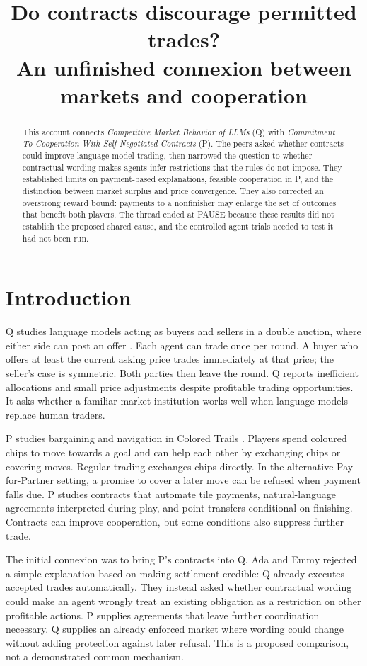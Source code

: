 \documentclass{article}
\title{Do contracts discourage permitted trades?\\An unfinished connexion between markets and cooperation}
\author{}
\date{}
\begin{document}
\maketitle
\begin{abstract}
This account connects \emph{Competitive Market Behavior of LLMs} (Q) with \emph{Commitment To Cooperation With
Self-Negotiated Contracts} (P). The peers asked whether contracts could improve language-model trading, then
narrowed the question to whether contractual wording makes agents infer restrictions that the rules do not
impose. They established limits on payment-based explanations, feasible cooperation in P, and the distinction
between market surplus and price convergence. They also corrected an overstrong reward bound: payments to a
nonfinisher may enlarge the set of outcomes that benefit both players. The thread ended at PAUSE because these
results did not establish the proposed shared cause, and the controlled agent trials needed to test it had not
been run.
\end{abstract}

\section{Introduction}
Q studies language models acting as buyers and sellers in a double auction, where either side can post an
offer \cite{Q}. Each agent can trade once per round. A buyer who offers at least the current asking price
trades immediately at that price; the seller's case is symmetric. Both parties then leave the round. Q reports
inefficient allocations and small price adjustments despite profitable trading opportunities. It asks whether
a familiar market institution works well when language models replace human traders.

P studies bargaining and navigation in Colored Trails \cite{P}. Players spend coloured chips to move towards a
goal and can help each other by exchanging chips or covering moves. Regular trading exchanges chips directly.
In the alternative Pay-for-Partner setting, a promise to cover a later move can be refused when payment falls
due. P studies contracts that automate tile payments, natural-language agreements interpreted during play, and
point transfers conditional on finishing. Contracts can improve cooperation, but some conditions also suppress
further trade.

The initial connexion was to bring P's contracts into Q. Ada and Emmy rejected a simple explanation based on
making settlement credible: Q already executes accepted trades automatically. They instead asked whether
contractual wording could make an agent wrongly treat an existing obligation as a restriction on other
profitable actions. P supplies agreements that leave further coordination necessary. Q supplies an already
enforced market where wording could change without adding protection against later refusal. This is a proposed
comparison, not a demonstrated common mechanism.
\end{document}

